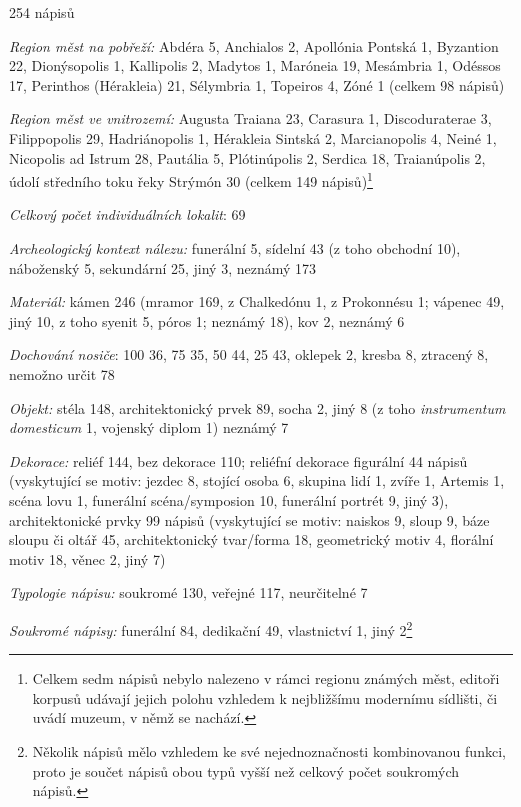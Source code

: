 \placetable[none]{}
\starttable[|l|]
\HL
{} 254 nápisů

{\em Region měst na pobřeží:} Abdéra 5, Anchialos 2, Apollónia Pontská 1, Byzantion 22, Dionýsopolis 1, Kallipolis 2, Madytos 1, Maróneia 19, Mesámbria 1, Odéssos 17, Perinthos (Hérakleia) 21, Sélymbria 1, Topeiros 4, Zóné 1 (celkem 98 nápisů)

{\em Region měst ve vnitrozemí:} Augusta Traiana 23, Carasura 1, Discoduraterae 3, Filippopolis 29, Hadriánopolis 1, Hérakleia Sintská 2, Marcianopolis 4, Neiné 1, Nicopolis ad Istrum 28, Pautália 5, Plótinúpolis 2, Serdica 18, Traianúpolis 2, údolí středního toku řeky Strýmón 30 (celkem 149 nápisů)\footnote{Celkem sedm nápisů nebylo nalezeno v rámci regionu známých měst, editoři korpusů udávají jejich polohu vzhledem k nejbližšímu modernímu sídlišti, či uvádí muzeum, v němž se nachází.}

{\em Celkový počet individuálních lokalit}: 69

{\em Archeologický kontext nálezu:} funerální 5, sídelní 43 (z toho obchodní 10), náboženský 5, sekundární 25, jiný 3, neznámý 173

{\em Materiál:} kámen 246 (mramor 169, z Chalkedónu 1, z Prokonnésu 1; vápenec 49, jiný 10, z toho syenit 5, póros 1; neznámý 18), kov 2, neznámý 6

{\em Dochování nosiče}: 100  36, 75  35, 50  44, 25  43, oklepek 2, kresba 8, ztracený 8, nemožno určit 78

{\em Objekt:} stéla 148, architektonický prvek 89, socha 2, jiný 8 (z toho {\em instrumentum domesticum} 1, vojenský diplom 1) neznámý 7

{\em Dekorace:} reliéf 144, bez dekorace 110; reliéfní dekorace figurální 44 nápisů (vyskytující se motiv: jezdec 8, stojící osoba 6, skupina lidí 1, zvíře 1, Artemis 1, scéna lovu 1, funerální scéna/symposion 10, funerální portrét 9, jiný 3), architektonické prvky 99 nápisů (vyskytující se motiv: naiskos 9, sloup 9, báze sloupu či oltář 45, architektonický tvar/forma 18, geometrický motiv 4, florální motiv 18, věnec 2, jiný 7)

{\em Typologie nápisu:} soukromé 130, veřejné 117, neurčitelné 7

{\em Soukromé nápisy:} funerální 84, dedikační 49, vlastnictví 1, jiný 2\footnote{Několik nápisů mělo vzhledem ke své nejednoznačnosti kombinovanou funkci, proto je součet nápisů obou typů vyšší než celkový počet soukromých nápisů.}

